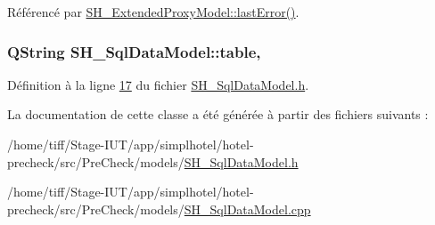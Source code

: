 Référencé par \hyperlink{classSH__ExtendedProxyModel_afb11fa89e1181d88843ea0f7fb3fe654}{S\-H\-\_\-\-Extended\-Proxy\-Model\-::last\-Error()}.

\hypertarget{classSH__SqlDataModel_afd3e2e62c847463c5177ccad35ad4992}{
\subsubsection[{table}]{\setlength{\rightskip}{0pt plus 5cm}Q\-String S\-H\-\_\-\-Sql\-Data\-Model\-::table\hspace{0.3cm}{\ttfamily [read]}, {\ttfamily [write]}}}\label{classSH__SqlDataModel_afd3e2e62c847463c5177ccad35ad4992}


Définition à la ligne \hyperlink{SH__SqlDataModel_8h_source_l00017}{17} du fichier \hyperlink{SH__SqlDataModel_8h_source}{S\-H\-\_\-\-Sql\-Data\-Model.\-h}.



La documentation de cette classe a été générée à partir des fichiers suivants \-:\begin{DoxyCompactItemize}
\item 
/home/tiff/\-Stage-\/\-I\-U\-T/app/simplhotel/hotel-\/precheck/src/\-Pre\-Check/models/\hyperlink{SH__SqlDataModel_8h}{S\-H\-\_\-\-Sql\-Data\-Model.\-h}\item 
/home/tiff/\-Stage-\/\-I\-U\-T/app/simplhotel/hotel-\/precheck/src/\-Pre\-Check/models/\hyperlink{SH__SqlDataModel_8cpp}{S\-H\-\_\-\-Sql\-Data\-Model.\-cpp}\end{DoxyCompactItemize}
